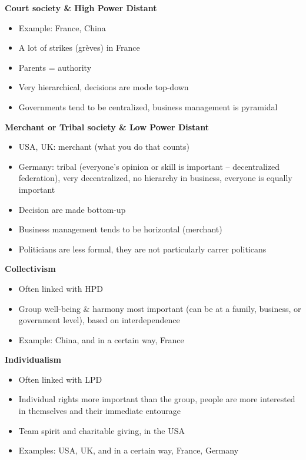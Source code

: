\documentclass[11pt,a4paper,oneside,french,svgnames]{report}
\begin{document}
\begin{center}
\begin{minipage}[t]{.49\textwidth}
\centering\textbf{Court society \& High Power Distant}\\
  \begin{itemize}
    \item Example: France, China
    \item A lot of strikes (grèves) in France
    \item Parents = authority
    \item Very hierarchical, decisions are mode top-down
    \item Governments tend to be centralized, business management is pyramidal
  \end{itemize}
\end{minipage}
\begin{minipage}[t]{.49\textwidth}
\centering\textbf{Merchant or Tribal society \& Low Power Distant}\\
  \begin{itemize}
    \item USA, UK: merchant (what you do that counts)
    \item Germany: tribal (everyone's opinion or skill is important -- decentralized federation), very decentralized, no hierarchy in business, everyone is equally important
    \item Decision are made bottom-up
    \item Business management tends to be horizontal (merchant)
    \item Politicians are less formal, they are not particularly carrer politicans
  \end{itemize}
\end{minipage}

\begin{minipage}[t]{.49\textwidth}
\centering\textbf{Collectivism}\\
  \begin{itemize}
    \item Often linked with HPD
    \item Group well-being \& harmony most important (can be at a family, business, or government level), based on interdependence
    \item Example: China, and in a certain way, France
  \end{itemize}
\end{minipage}
\begin{minipage}[t]{.49\textwidth}
\centering\textbf{Individualism}\\
  \begin{itemize}
    \item Often linked with LPD
    \item Individual rights more important than the group, people are more interested in themselves and their immediate entourage
    \item Team spirit and charitable giving, in the USA
    \item Examples: USA, UK, and in a certain way, France, Germany
  \end{itemize}
\end{minipage}


\end{center}
\end{document}
